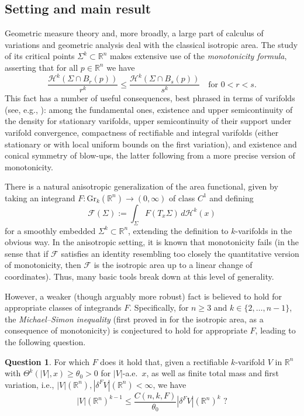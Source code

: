 \documentclass[11pt,a4paper]{amsart}
\newcommand{\R}{\mathbb{R}}
\theoremstyle{definition}
\newtheorem{conj}[definition]{Question}
\newcommand{\gr}{\text{Gr}_k(\R^n)}
\begin{document}
\subsection{Setting and main result}
Geometric measure theory and, more broadly, a large part of calculus of variations and geometric analysis
deal with the classical isotropic area. The study of its critical points $\Sigma^k\subset\R^n$ makes extensive use of the \emph{monotonicity formula}, asserting that for all \(p\in\R^n\) we have
$$\frac{\mathcal{H}^k(\Sigma\cap B_r(p))}{r^k}\le\frac{\mathcal{H}^k(\Sigma\cap B_s(p))}{s^k}\quad\text{for }0<r<s.$$
 This fact has a number of useful consequences, best phrased in terms of varifolds (see, e.g., \cite[Chapters 4 and 8]{Simon}): among the fundamental ones, existence and
upper semicontinuity of the density for stationary varifolds, upper semicontinuity of their support
under varifold convergence,
compactness of rectifiable and integral varifolds (either stationary or with local uniform bounds on the first variation), and existence and conical symmetry of blow-ups, the latter following
from a more precise version of monotonicity.

There is a natural anisotropic generalization of the area functional, given by
taking an integrand $F:\gr\to(0,\infty)$ of class $C^1$ and defining
$$\mathcal{F}(\Sigma):=\int_\Sigma F(T_x\Sigma)\,d\mathcal{H}^k(x)$$
for a smoothly embedded $\Sigma^k\subset\R^n$, extending the definition to $k$-varifolds in the obvious way.
In the anisotropic setting, it is known \cite{All.no.mono} that monotonicity fails
(in the sense that if $\mathcal{F}$ satisfies an identity resembling too closely
the quantitative version of monotonicity, then $\mathcal{F}$ is the isotropic area up to a linear change of coordinates).
Thus, many basic tools break down at this level of generality.

However, a weaker (though arguably more robust) fact is believed to hold
for appropriate classes of integrands $F$.
Specifically, for $n\ge3$ and $k\in \{2,\dots,n-1\}$, the \emph{Michael--Simon inequality}
(first proved in \cite{MS} for the isotropic area, as a consequence of monotonicity)
is conjectured to hold for appropriate $F$, leading to the following question.

\begin{conj}\label{ms.conj}
    For which $F$ does it hold that,
    given a rectifiable $k$-varifold $V$ in $\R^n$ with $\Theta^k(|V|,x)\ge\theta_0>0$ for $|V|$-a.e.\ $x$, as well as finite total mass and first variation, i.e.,
    $|V|(\R^n),|\delta^FV|(\R^n)<\infty$, we have
    \begin{equation}\label{ms}|V|(\R^n)^{k-1}\le \frac{C(n,k,F)}{\theta_0}|\delta^FV|(\R^n)^k\text{ ?}\end{equation}
\end{conj}
\end{document}
